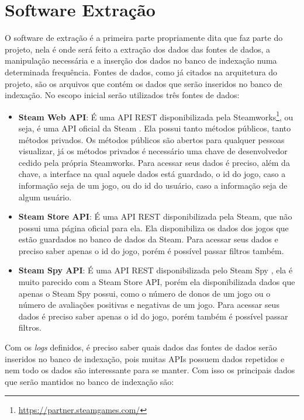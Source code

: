 \section{Software Extração}
O software de extração é a primeira parte propriamente dita que faz parte do projeto, nela é onde será feito a extração dos dados das fontes de dados, a manipulação necessária e a inserção dos dados no banco de indexação numa determinada frequência. Fontes de dados, como já citados na arquitetura do projeto, são os arquivos que contém os dados que serão inseridos no banco de indexação. No escopo inicial serão utilizados três fontes de dados:
\begin{itemize}
	\item \textbf{Steam Web API}: É uma API REST disponibilizada pela Steamworks\footnote[8]{\url{https://partner.steamgames.com/}}, ou seja, é uma API oficial da Steam \cite{steam_api}. Ela possui tanto métodos públicos, tanto métodos privados. Os métodos públicos são abertos para qualquer pessoas visualizar, já os métodos privados é necessário uma chave de desenvolvedor cedido pela própria Steamworks. Para acessar seus dados é preciso, além da chave, a interface na qual aquele dados está guardado, o id do jogo, caso a informação seja de um jogo, ou do id do usuário, caso a informação seja de algum usuário.
	\item \textbf{Steam Store API}: É uma API REST disponibilizada pela Steam, que não possui uma página oficial para ela. Ela disponibiliza os dados dos jogos que estão guardados no banco de dados da Steam. Para acessar seus dados e preciso saber apenas o id do jogo, porém é possível passar filtros também.
	\item \textbf{Steam Spy API}: É uma API REST disponibilizada pelo Steam Spy \cite{steam_spy}, ela é muito parecido com a Steam Store API, porém ela disponibilizada dados que apenas o Steam Spy possui, como o número de donos de um jogo ou o número de avaliações positivas e negativas de um jogo. Para acessar seus dados é preciso saber apenas o id do jogo, porém também é possível passar filtros.
\end{itemize}
Com os \textit{logs} definidos, é preciso saber quais dados das fontes de dados serão inseridos no banco de indexação, pois muitas APIs possuem dados repetidos e nem todo os dados são interessante para se manter. Com isso os principais dados que serão mantidos no banco de indexação são:
